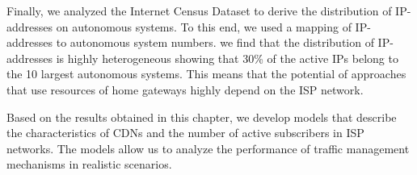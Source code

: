 Finally, we analyzed the Internet Census Dataset to derive the distribution of IP-addresses on autonomous systems.
To this end, we used a mapping of IP-addresses to autonomous system numbers.
we find that the distribution of IP-addresses is highly heterogeneous showing that 30\% of the active IPs belong to the 10 largest autonomous systems.
This means that the potential of approaches that use resources of home gateways highly depend on the ISP network.

Based on the results obtained in this chapter, we develop models that describe the characteristics of CDNs and the number of active subscribers in ISP networks.
The models allow us to analyze the performance of traffic management mechanisms in realistic scenarios.

